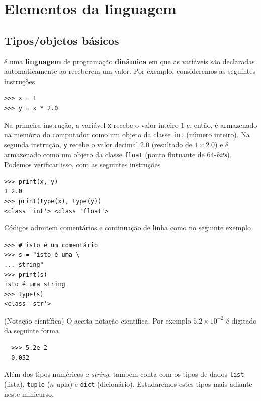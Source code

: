 \documentclass[12pt]{article}
\begin{document}
\section{Elementos da linguagem}\label{sec_elem}

\subsection{Tipos/objetos básicos}

{\python} é uma {\bf linguagem} de programação {\bf dinâmica} em que as variáveis são declaradas automaticamente ao receberem um valor. Por exemplo, consideremos as seguintes instruções
\begin{lstlisting}
>>> x = 1
>>> y = x * 2.0
\end{lstlisting}
Na primeira instrução, a variável \lstinline+x+ recebe o valor inteiro $1$ e, então, é armazenado na memória do computador como um objeto da classe \lstinline+int+ (número inteiro). Na segunda instrução, \lstinline+y+ recebe o valor decimal $2.0$ (resultado de $1\times 2.0$) e é armazenado como um objeto da classe \lstinline+float+ (ponto flutuante de 64-{\it bits}). Podemos verificar isso, com as seguintes instruções
\begin{lstlisting}
>>> print(x, y)
1 2.0
>>> print(type(x), type(y))
<class 'int'> <class 'float'>
\end{lstlisting}

Códigos {\python} admitem comentários e continuação de linha como no seguinte exemplo
\begin{lstlisting}
>>> # isto é um comentário
>>> s = "isto é uma \
... string"
>>> print(s)
isto é uma string
>>> type(s)
<class 'str'>
\end{lstlisting}

\begin{obs}(Notação científica)
  O {\python} aceita notação científica. Por exemplo $5.2\times 10^{-2}$ é digitado da seguinte forma
  \begin{lstlisting}
  >>> 5.2e-2
  0.052
  \end{lstlisting}
\end{obs}

\begin{obs}
  Além dos tipos numéricos e {\it string}, {\python} também conta com os tipos de dados \lstinline+list+ (lista), \lstinline+tuple+ ($n$-upla) e \lstinline+dict+ (dicionário). Estudaremos estes tipos mais adiante neste minicurso.
\end{obs}
\end{document}
